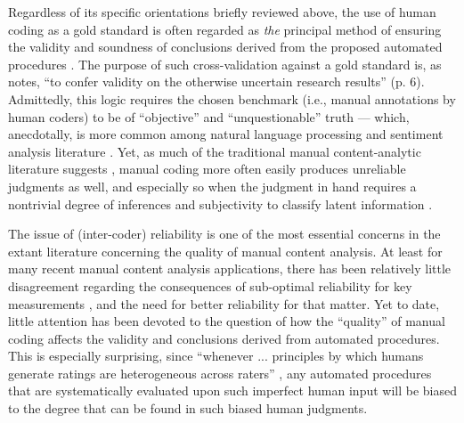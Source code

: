 \documentclass[man, floatsintext, 12pt, a4paper, noextraspace]{apa6}
\begin{document}
    Regardless of its specific orientations briefly reviewed above, the use of human coding as a gold standard is often regarded as \textit{the} principal method of ensuring the validity and soundness of conclusions derived from the proposed automated procedures \parencites[e.g., ][]{grimmer2013text, dimaggio2015adapting}. The purpose of such cross-validation against a gold standard is, as \textcite{Krippendorff2008validity} notes, \enquote{to confer validity on the otherwise uncertain research results} (p. 6). Admittedly, this logic requires the chosen benchmark (i.e., manual annotations by human coders) to be of \enquote{objective} and \enquote{unquestionable} truth --- which, anecdotally, is more common among natural language processing and sentiment analysis literature \parencites[][]{dimaggio2015adapting}. Yet, as much of the traditional manual content-analytic literature suggests \parencites[e.g.,][]{krippendorff2004reliability, hayes2007answering, lombard2002content, ennser2018impact}, manual coding more often easily produces unreliable judgments as well, and especially so when the judgment in hand requires a nontrivial degree of inferences and subjectivity to classify latent information \parencites[][]{riff2014analyzing, Krippendorff2013}.       
    
    The issue of (inter-coder) reliability is one of the most essential concerns in the extant literature concerning the quality of manual content analysis. At least for many recent manual content analysis applications, there has been relatively little disagreement regarding the consequences of sub-optimal reliability for key measurements \parencites[][]{krippendorff2004reliability, Krippendorff2013}, and the need for better reliability for that matter. Yet to date, little attention has been devoted to the question of how the \enquote{quality} of manual coding affects the validity and conclusions derived from automated procedures. This is especially surprising, since \enquote{whenever ... principles by which humans generate ratings are heterogeneous across raters} \parencites[][p. 4]{dimaggio2015adapting}, any automated procedures that are systematically evaluated upon such imperfect human input will be biased to the degree that can be found in such biased human judgments. 
    
\end{document}
